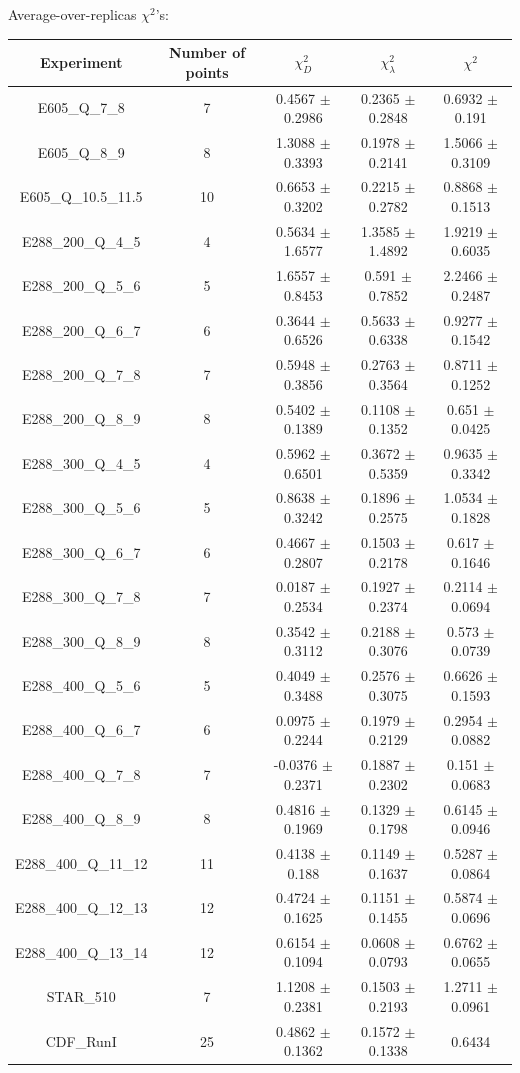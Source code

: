 \documentclass[
]{article}
\begin{document}
Average-over-replicas \(\chi^2\)'s:

\begin{longtable}[]{@{}ccccc@{}}
\toprule
Experiment & Number of points & \(\chi_{D}^2\) & \(\chi_{\lambda}^2\) &
\(\chi^2\)\tabularnewline
\midrule
\endhead
E605\_Q\_7\_8 & 7 & 0.4567 \(\pm\) 0.2986 & 0.2365 \(\pm\) 0.2848 &
0.6932 \(\pm\) 0.191\tabularnewline
E605\_Q\_8\_9 & 8 & 1.3088 \(\pm\) 0.3393 & 0.1978 \(\pm\) 0.2141 &
1.5066 \(\pm\) 0.3109\tabularnewline
E605\_Q\_10.5\_11.5 & 10 & 0.6653 \(\pm\) 0.3202 & 0.2215 \(\pm\) 0.2782
& 0.8868 \(\pm\) 0.1513\tabularnewline
E288\_200\_Q\_4\_5 & 4 & 0.5634 \(\pm\) 1.6577 & 1.3585 \(\pm\) 1.4892 &
1.9219 \(\pm\) 0.6035\tabularnewline
E288\_200\_Q\_5\_6 & 5 & 1.6557 \(\pm\) 0.8453 & 0.591 \(\pm\) 0.7852 &
2.2466 \(\pm\) 0.2487\tabularnewline
E288\_200\_Q\_6\_7 & 6 & 0.3644 \(\pm\) 0.6526 & 0.5633 \(\pm\) 0.6338 &
0.9277 \(\pm\) 0.1542\tabularnewline
E288\_200\_Q\_7\_8 & 7 & 0.5948 \(\pm\) 0.3856 & 0.2763 \(\pm\) 0.3564 &
0.8711 \(\pm\) 0.1252\tabularnewline
E288\_200\_Q\_8\_9 & 8 & 0.5402 \(\pm\) 0.1389 & 0.1108 \(\pm\) 0.1352 &
0.651 \(\pm\) 0.0425\tabularnewline
E288\_300\_Q\_4\_5 & 4 & 0.5962 \(\pm\) 0.6501 & 0.3672 \(\pm\) 0.5359 &
0.9635 \(\pm\) 0.3342\tabularnewline
E288\_300\_Q\_5\_6 & 5 & 0.8638 \(\pm\) 0.3242 & 0.1896 \(\pm\) 0.2575 &
1.0534 \(\pm\) 0.1828\tabularnewline
E288\_300\_Q\_6\_7 & 6 & 0.4667 \(\pm\) 0.2807 & 0.1503 \(\pm\) 0.2178 &
0.617 \(\pm\) 0.1646\tabularnewline
E288\_300\_Q\_7\_8 & 7 & 0.0187 \(\pm\) 0.2534 & 0.1927 \(\pm\) 0.2374 &
0.2114 \(\pm\) 0.0694\tabularnewline
E288\_300\_Q\_8\_9 & 8 & 0.3542 \(\pm\) 0.3112 & 0.2188 \(\pm\) 0.3076 &
0.573 \(\pm\) 0.0739\tabularnewline
E288\_400\_Q\_5\_6 & 5 & 0.4049 \(\pm\) 0.3488 & 0.2576 \(\pm\) 0.3075 &
0.6626 \(\pm\) 0.1593\tabularnewline
E288\_400\_Q\_6\_7 & 6 & 0.0975 \(\pm\) 0.2244 & 0.1979 \(\pm\) 0.2129 &
0.2954 \(\pm\) 0.0882\tabularnewline
E288\_400\_Q\_7\_8 & 7 & -0.0376 \(\pm\) 0.2371 & 0.1887 \(\pm\) 0.2302
& 0.151 \(\pm\) 0.0683\tabularnewline
E288\_400\_Q\_8\_9 & 8 & 0.4816 \(\pm\) 0.1969 & 0.1329 \(\pm\) 0.1798 &
0.6145 \(\pm\) 0.0946\tabularnewline
E288\_400\_Q\_11\_12 & 11 & 0.4138 \(\pm\) 0.188 & 0.1149 \(\pm\) 0.1637
& 0.5287 \(\pm\) 0.0864\tabularnewline
E288\_400\_Q\_12\_13 & 12 & 0.4724 \(\pm\) 0.1625 & 0.1151 \(\pm\)
0.1455 & 0.5874 \(\pm\) 0.0696\tabularnewline
E288\_400\_Q\_13\_14 & 12 & 0.6154 \(\pm\) 0.1094 & 0.0608 \(\pm\)
0.0793 & 0.6762 \(\pm\) 0.0655\tabularnewline
STAR\_510 & 7 & 1.1208 \(\pm\) 0.2381 & 0.1503 \(\pm\) 0.2193 & 1.2711
\(\pm\) 0.0961\tabularnewline
CDF\_RunI & 25 & 0.4862 \(\pm\) 0.1362 & 0.1572 \(\pm\) 0.1338 & 0.6434

\end{longtable}
\end{document}
